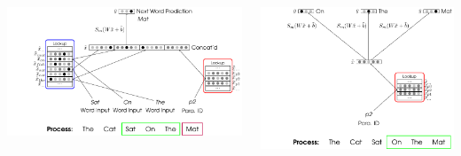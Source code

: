 \documentclass[a0papper, landscape]{tikzposter}
\begin{document}
\begin{columns}
{		
		{
			\begin{minipage}[t]{0.48\linewidth}
			     \begin{tikzfigure}
				     	\includegraphics[width=\textwidth]{pvdm/PVDM3_poster}
			     \end{tikzfigure}				
			\end{minipage}%
			\hfill
			\begin{adjustbox}{valign=t}
				\begin{minipage}[t]{0.48\linewidth}
				 \small{}
				\end{minipage}
			\end{adjustbox}
		 }
	  	\vspace{2ex}
		{
			\begin{minipage}[t]{0.48\linewidth}
				\begin{tikzfigure}
					\includegraphics[width=\textwidth]{pvdbow/PVDBOW_poster}

\end{tikzfigure}
\end{minipage}}}
\end{columns}
\end{document}

